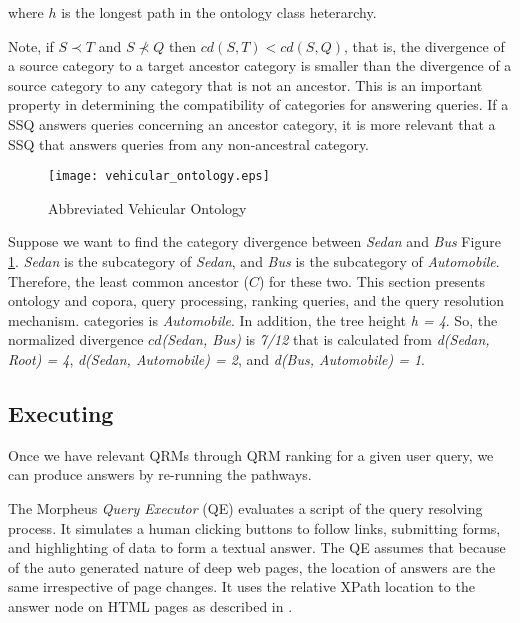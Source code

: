 \noindent where $h$ is the longest path in the ontology class heterarchy.

Note, if $S \prec T$ and $S \not\prec Q$ then $cd(S,T) <
cd(S,Q)$, that is, the divergence of a source category to a target
ancestor category is smaller than the divergence of a source category to any
category that is not an ancestor. This is an important property in
determining the compatibility of categories for answering queries.  If a
SSQ answers queries concerning an ancestor category, it is more relevant
that a SSQ that answers queries from any non-ancestral category.

\begin{figure}[t]
	\centering
\texttt{[image: vehicular\_ontology.eps]}
\caption{Abbreviated Vehicular Ontology}%
\label{fig:vehicular_ontology}
\end{figure}

Suppose we want to find the category divergence between \textit{Sedan} and \textit{Bus} Figure \ref{fig:vehicular_ontology}. \textit{Sedan} is the subcategory of \textit{Sedan}, and \textit{Bus} is the subcategory of \textit{Automobile}. Therefore, the least common ancestor ($C$) for these two. This section presents ontology and copora, query processing, ranking queries, and the query resolution mechanism. categories is \textit{Automobile}. In addition, the tree height \textit{h = 4}. So, the normalized divergence $cd$\textit{(Sedan, Bus)} is \textit{7/12} that is calculated from \textit{d(Sedan, Root) = 4}, \textit{d(Sedan, Automobile) = 2}, and \textit{d(Bus, Automobile) = 1}.

\subsection{Executing} 

Once we have relevant QRMs through QRM ranking for a given user query, we can produce answers by re-running the pathways.

The Morpheus \emph{Query Executor} (QE) evaluates a script of the query resolving process.  It simulates a human clicking buttons to follow links, submitting forms, and highlighting of data to form a textual answer.  The QE assumes that because of the auto generated nature of deep web pages, the location of answers are the same irrespective of page changes.  It uses the relative XPath location to the answer node on HTML pages as described in \cite{Badica06}.



